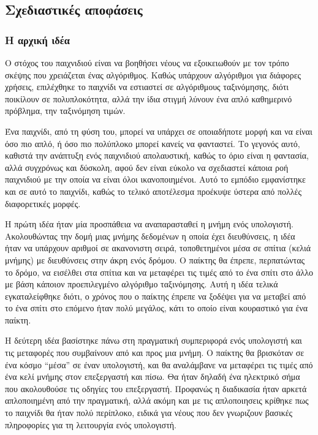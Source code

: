 \subsection{Σχεδιαστικές αποφάσεις}

\subsubsection{Η αρχική ιδέα}

Ο στόχος του παιχνιδιού είναι να βοηθήσει νέους να εξοικειωθούν με τον τρόπο σκέψης που χρειάζεται ένας αλγόριθμος. Καθώς υπάρχουν αλγόριθμοι για διάφορες χρήσεις, επιλέχθηκε το παιχνίδι να εστιαστεί σε αλγόριθμους ταξινόμησης, διότι ποικίλουν σε πολυπλοκότητα, αλλά την ίδια στιγμή λύνουν ένα απλό καθημερινό πρόβλημα, την ταξινόμηση τιμών.

Ένα παιχνίδι, από τη φύση του, μπορεί να υπάρχει σε οποιαδήποτε μορφή και να είναι όσο πιο απλό, ή όσο πιο πολύπλοκο μπορεί κανείς να φανταστεί. Το γεγονός αυτό, καθιστά την ανάπτυξη ενός παιχνιδιού απολαυστική, καθώς το όριο είναι η φαντασία, αλλά συγχρόνως και δύσκολη, αφού δεν είναι εύκολο να σχεδιαστεί κάποια ροή παιχνιδιού με την οποία να είναι όλοι ικανοποιημένοι. Αυτό το εμπόδιο εμφανίστηκε και σε αυτό το παιχνίδι, καθώς το τελικό αποτέλεσμα προέκυψε ύστερα από πολλές διαφορετικές μορφές.

Η πρώτη ιδέα ήταν μία προσπάθεια να αναπαρασταθεί η μνήμη ενός υπολογιστή. Ακολουθώντας την δομή μιας μνήμης δεδομένων η οποία έχει διευθύνσεις, η ιδέα ήταν να υπάρχουν αριθμοί σε ακανονιστη σειρά, τοποθετημένοι μέσα σε σπίτια (κελιά μνήμης) με διευθύνσεις στην άκρη ενός δρόμου. Ο παίκτης θα έπρεπε, περπατώντας το δρόμο, να εισέλθει στα σπίτια και να μεταφέρει τις τιμές από το ένα σπίτι στο άλλο με βάση κάποιον προεπιλεγμένο αλγόριθμο ταξινόμησης. Αυτή η ιδέα τελικά εγκαταλείφθηκε διότι, ο χρόνος που ο παίκτης έπρεπε να ξοδέψει για να μεταβεί από το ένα σπίτι στο επόμενο ήταν πολύ μεγάλος, κάτι το οποίο είναι κουραστικό για ένα παίκτη.

Η δεύτερη ιδέα βασίστηκε πάνω στη πραγματική συμπεριφορά ενός υπολογιστή και τις μεταφορές που συμβαίνουν από και προς μια μνήμη. Ο παίκτης θα βρισκόταν σε ένα κόσμο “μέσα” σε έναν υπολογιστή, και θα αναλάμβανε να μεταφέρει τις τιμές από ένα κελί μνήμης στον επεξεργαστή και πίσω. Θα ήταν δηλαδή ένα ηλεκτρικό σήμα που ακολουθούσε τις οδηγίες του επεξεργαστή. Προφανώς η διαδικασία ήταν αρκετά απλοποιημένη από την πραγματική, αλλά ακόμη και με τις απλοποιησεις κρίθηκε πως το παιχνίδι θα ήταν πολύ περίπλοκο, ειδικά για νέους που δεν γνωριζουν βασικές πληροφορίες για τη λειτουργία ενός υπολογιστή.

